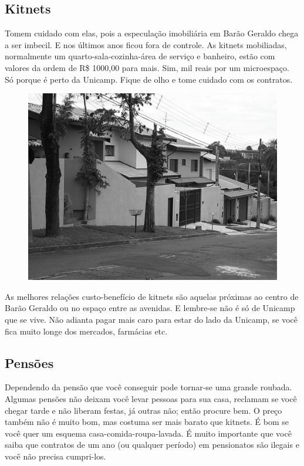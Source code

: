 \subsection{Kitnets}

Tomem cuidado com elas, pois a especulação imobiliária em Barão Geraldo chega
a ser imbecil. E nos últimos anos ficou fora de controle. As kitnets mobiliadas,
normalmente um quarto-sala-cozinha-área de serviço e banheiro, estão com valores
da ordem de R\$ 1000,00 para mais. Sim, mil reais por um microespaço. Só porque
é perto da Unicamp. Fique de olho e tome cuidado com os contratos.
\begin{figure}[h!]
    \centering
    \includegraphics[scale=0.55,keepaspectratio=true]{img/imgs/5-moradia/-033.jpg}
\end{figure}

As melhores relações custo-benefício de kitnets são aquelas próximas ao centro
de Barão Geraldo ou no espaço entre as avenidas. E lembre-se não é só de Unicamp
que se vive. Não adianta pagar mais caro para estar do lado da Unicamp, se você
fica muito longe dos mercados, farmácias etc.

\subsection{Pensões}

Dependendo da pensão que você conseguir pode tornar-se uma grande roubada.
Algumas pensões não deixam você levar pessoas para sua casa, reclamam se você
chegar tarde e não liberam festas, já outras não; então procure bem. O preço
também não é muito bom, mas costuma ser mais barato que kitnets. É bom se você
quer um esquema casa-comida-roupa-lavada. É muito importante que você saiba que
contratos de um ano (ou qualquer período) em pensionatos são ilegais e você não
precisa cumpri-los.

